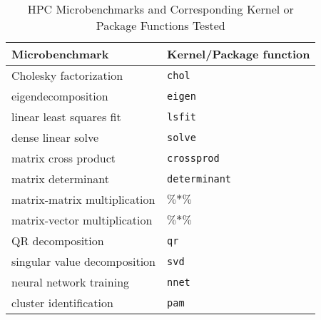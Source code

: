 \begin{table*}
  \caption{HPC Microbenchmarks and Corresponding Kernel or Package Functions Tested}
  \label{tab:microbenchmarks}
  \begin{tabular}{ll}
    \toprule
    Microbenchmark & Kernel/Package function \\
    \midrule
    Cholesky factorization       & \texttt{chol} \\
    eigendecomposition           & \texttt{eigen} \\
    linear least squares fit     & \texttt{lsfit} \\
    dense linear solve           & \texttt{solve} \\
    matrix cross product         & \texttt{crossprod} \\
    matrix determinant           & \texttt{determinant} \\
    matrix-matrix multiplication & $\%$$*$$\%$ \\
    matrix-vector multiplication & $\%$$*$$\%$ \\
    QR decomposition             & \texttt{qr} \\
    singular value decomposition & \texttt{svd} \\
    neural network training      & \texttt{nnet} \\
    cluster identification       & \texttt{pam} \\
    \bottomrule
  \end{tabular}
\end{table*}


